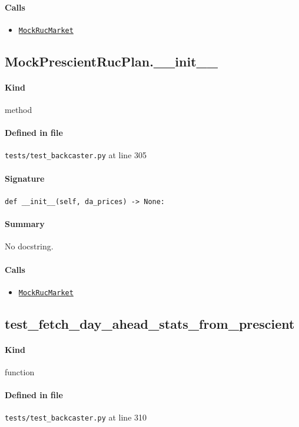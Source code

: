 \documentclass[11pt]{report}
\begin{document}
\paragraph{Calls}
\begin{itemize}[leftmargin=*]
  \item \hyperref[def:tests-test_backcaster.py:MockRucMarket:L299]{\texttt{MockRucMarket}}
\end{itemize}
\subsection{MockPrescientRucPlan.\_\_init\_\_}
\label{def:tests-test_backcaster.py:MockPrescientRucPlan.__init__:L305}
\paragraph{Kind} method
\paragraph{Defined in file} \texttt{tests/test\_backcaster.py} at line 305
\paragraph{Signature} \texttt{def \_\_init\_\_(self, da\_prices) -> None:}
\paragraph{Summary} No docstring.
\paragraph{Calls}
\begin{itemize}[leftmargin=*]
  \item \hyperref[def:tests-test_backcaster.py:MockRucMarket:L299]{\texttt{MockRucMarket}}
\end{itemize}
\subsection{test\_fetch\_day\_ahead\_stats\_from\_prescient}
\label{def:tests-test_backcaster.py:test_fetch_day_ahead_stats_from_prescient:L310}
\paragraph{Kind} function
\paragraph{Defined in file} \texttt{tests/test\_backcaster.py} at line 310
\end{document}
